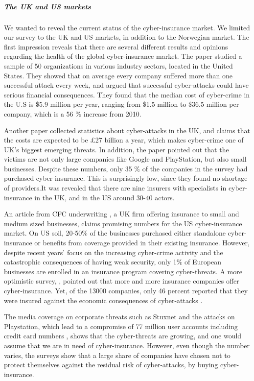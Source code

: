 \subparagraph{The UK and US markets}
We wanted to reveal the current status of the cyber-insurance market. We limited our survey to the UK and US markets, in addition to the Norwegian market. 
The first impression reveals that there are several different results and opinions regarding the health of the global cyber-insurance market. 
The paper \cite{ccost} studied a sample of 50 organizations in various industry sectors, located in the United States. They showed that on average every company suffered more than one successful attack every week, and argued that successful cyber-attacks could have serious financial consequences. They found that the median cost of cyber-crime in the U.S is \$5.9 million per year, ranging from \$1.5 million to \$36.5 million per company, which is a 56 $\%$ increase from 2010. 
 
 Another paper \cite{evolvingcyber} collected statistics about cyber-attacks in the UK, and claims that the costs are expected to be \pounds 27 billion a year, which makes cyber-crime one of UK's biggest emerging threats. In addition, the paper pointed out that the victims are not only large companies like Google and PlayStation, but also small businesses. Despite these numbers, only 35 $\%$ of the companies in the survey had purchased cyber-insurance. This is surprisingly low, since they found no shortage of providers.It was revealed that there are nine insurers with specialists in cyber-insurance in the UK, and in the US around 30-40 actors.  
 
 
 An article from CFC underwriting \cite{CFCunder}, a UK firm offering insurance to small and medium sized businesses, claims promising numbers for the US cyber-insurance market. On US soil, 20-50$\%$ of the businesses purchased either standalone cyber-insurance or benefits from coverage provided in their existing insurance. However, despite recent years' focus on the increasing cyber-crime activity and the catastrophic consequences of having weak security, only 1$\%$ of European businesses are enrolled in an insurance program covering cyber-threats.
A more optimistic survey, \cite{compworld}, pointed out that more and more insurance companies offer cyber-insurance. Yet, of the 13000 companies, only 46 percent reported that they were insured against the economic consequences of cyber-attacks . 
 
 The media coverage on corporate threats such as Stuxnet and the attacks on Playstation, which lead to a compromise of 77 million user accounts including credit card numbers \cite{playstation}, shows that the cyber-threats are growing, and one would assume that we are in need of cyber-insurance. However, even though the number varies, the surveys show that a large share of companies have chosen not to protect themselves against the residual risk of cyber-attacks, by buying cyber-insurance.

